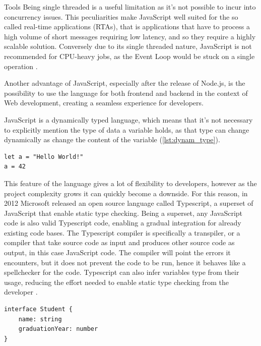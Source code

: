 \begin{chapter}{Tools}
    Being single threaded is a useful limitation as it's not possible to incur
    into concurrency issues.
    This peculiarities make JavaScript well suited for the so called real-time
    applications (RTAs), that is applications that have to process a high volume
    of short messages requiring low latency, and so they require a highly scalable
    solution. Conversely due to its single threaded nature, JavaScript is not
    recommended for CPU-heavy jobs, as the Event Loop would be stuck on a single
    operation \cite{node_event_loop}\cite{node_on_backend}.

    Another advantage of JavaScript, especially after the release of Node.js, is
    the possibility to use the language for both frontend and backend in the context
    of Web development, creating a seamless experience for developers.

    JavaScript is a dynamically typed language, which means that it's not necessary
    to explicitly mention the type of data a variable holds, as that type can change
    dynamically as change the content of the variable (\ref{lst:dynam_type}).

    \bigskip
    \begin{lstlisting}[caption=Dynamically typed variables, label={lst:dynam_type}]
let a = "Hello World!"
a = 42
    \end{lstlisting}

    This feature of the language gives a lot of flexibility to developers, however
    as the project complexity grows it can quickly become a downside.
    For this reason, in 2012 Microsoft released an open source language called
    Typescript, a superset of JavaScript that enable static type checking.
    Being a superset, any JavaScript code is also valid Typescript code, enabling
    a gradual integration for already existing code bases.
    The Typescript compiler is specifically a transpiler, or a compiler that take
    source code as input and produces other source code as output, in this case
    JavaScript code. The compiler will point the errors it encounters, but it does
    not prevent the code to be run, hence it behaves like a spellchecker for the code.
    Typescript can also infer variables type from their usage, reducing the effort
    needed to enable static type checking from the developer
    \cite{typescript_lang}\cite{typescript}.

    \bigskip
    \begin{lstlisting}[caption=Static type checking on Typescript, label={ts_static}]
interface Student {
    name: string
    graduationYear: number
}


\end{lstlisting}
\end{chapter}
